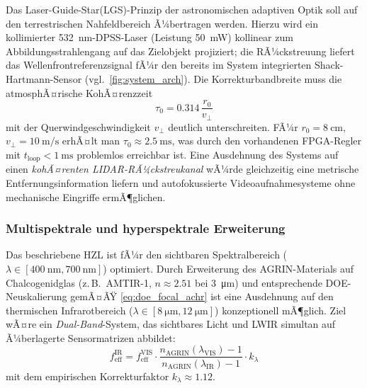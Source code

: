 ﻿\documentclass[12pt,a4paper]{article}
\theoremstyle{definition}
\newcommand{\eff}{\mathrm{eff}}
\begin{document}
	Das Laser-Guide-Star(LGS)-Prinzip der astronomischen adaptiven Optik
	soll auf den terrestrischen Nahfeldbereich Ã¼bertragen werden.
	Hierzu wird ein kollimierter \SI{532}{\nano\metre}-DPSS-Laser
	(Leistung \SI{50}{\milli\watt}) kollinear zum Abbildungsstrahlengang
	auf das Zielobjekt projiziert; die RÃ¼ckstreuung liefert das
	Wellenfrontreferenzsignal fÃ¼r den bereits im System integrierten
	Shack-Hartmann-Sensor (vgl.\ \cref{fig:system_arch}).  Die
	Korrekturbandbreite muss die atmosphÃ¤rische KohÃ¤renzzeit
	\begin{equation}
		\tau_0 = 0.314\,\frac{r_0}{v_\perp}
		\label{eq:tau0}
	\end{equation}
	mit der Querwindgeschwindigkeit $v_\perp$ deutlich unterschreiten.
	FÃ¼r $r_0 = \SI{8}{\centi\metre}$, $v_\perp = \SI{10}{\metre\per\second}$
	erhÃ¤lt man $\tau_0 \approx \SI{2.5}{\milli\second}$, was durch den
	vorhandenen FPGA-Regler mit $t_\mathrm{loop} < \SI{1}{\milli\second}$
	problemlos erreichbar ist.  Eine Ausdehnung des Systems auf einen
	\emph{kohÃ¤renten LIDAR-RÃ¼ckstreukanal} wÃ¼rde gleichzeitig eine
	metrische Entfernungsinformation liefern und autofokussierte
	Videoaufnahmesysteme ohne mechanische Eingriffe ermÃ¶glichen.

	\subsubsection{Multispektrale und hyperspektrale Erweiterung}

	Das beschriebene HZL ist fÃ¼r den sichtbaren Spektralbereich
	($\lambda \in [\SI{400}{\nano\metre}, \SI{700}{\nano\metre}]$)
	optimiert.  Durch Erweiterung des AGRIN-Materials auf Chalcogenidglas
	(z.\,B.\ AMTIR-1, $n \approx 2.51$ bei \SI{3}{\micro\metre}) und
	entsprechende DOE-Neuskalierung gemÃ¤ÃŸ \eqref{eq:doe_focal_achr}
	ist eine Ausdehnung auf den thermischen Infrarotbereich
	($\lambda \in [\SI{8}{\micro\metre}, \SI{12}{\micro\metre}]$)
	konzeptionell mÃ¶glich.  Ziel wÃ¤re ein \emph{Dual-Band}-System, das
	sichtbares Licht und LWIR simultan auf Ã¼berlagerte Sensormatrizen
	abbildet:
	\begin{equation}
		f_\eff^\mathrm{IR}
		= f_\eff^\mathrm{VIS}\cdot\frac{n_\mathrm{AGRIN}(\lambda_\mathrm{VIS}) - 1}
		{n_\mathrm{AGRIN}(\lambda_\mathrm{IR}) - 1}
		\cdot k_\lambda
		\label{eq:dual_band}
	\end{equation}
	mit dem empirischen Korrekturfaktor $k_\lambda \approx 1.12$.
\end{document}
